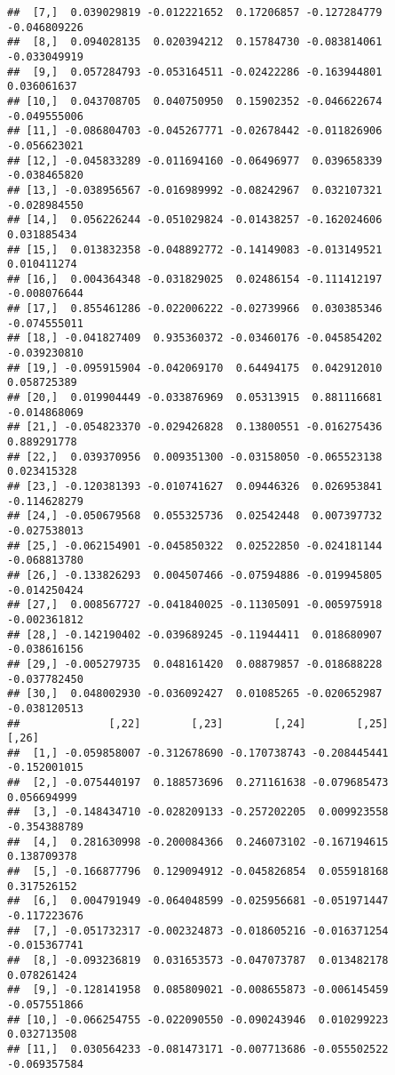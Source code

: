 \documentclass[
]{book}
\begin{document}
\begin{verbatim}
##  [7,]  0.039029819 -0.012221652  0.17206857 -0.127284779 -0.046809226
##  [8,]  0.094028135  0.020394212  0.15784730 -0.083814061 -0.033049919
##  [9,]  0.057284793 -0.053164511 -0.02422286 -0.163944801  0.036061637
## [10,]  0.043708705  0.040750950  0.15902352 -0.046622674 -0.049555006
## [11,] -0.086804703 -0.045267771 -0.02678442 -0.011826906 -0.056623021
## [12,] -0.045833289 -0.011694160 -0.06496977  0.039658339 -0.038465820
## [13,] -0.038956567 -0.016989992 -0.08242967  0.032107321 -0.028984550
## [14,]  0.056226244 -0.051029824 -0.01438257 -0.162024606  0.031885434
## [15,]  0.013832358 -0.048892772 -0.14149083 -0.013149521  0.010411274
## [16,]  0.004364348 -0.031829025  0.02486154 -0.111412197 -0.008076644
## [17,]  0.855461286 -0.022006222 -0.02739966  0.030385346 -0.074555011
## [18,] -0.041827409  0.935360372 -0.03460176 -0.045854202 -0.039230810
## [19,] -0.095915904 -0.042069170  0.64494175  0.042912010  0.058725389
## [20,]  0.019904449 -0.033876969  0.05313915  0.881116681 -0.014868069
## [21,] -0.054823370 -0.029426828  0.13800551 -0.016275436  0.889291778
## [22,]  0.039370956  0.009351300 -0.03158050 -0.065523138  0.023415328
## [23,] -0.120381393 -0.010741627  0.09446326  0.026953841 -0.114628279
## [24,] -0.050679568  0.055325736  0.02542448  0.007397732 -0.027538013
## [25,] -0.062154901 -0.045850322  0.02522850 -0.024181144 -0.068813780
## [26,] -0.133826293  0.004507466 -0.07594886 -0.019945805 -0.014250424
## [27,]  0.008567727 -0.041840025 -0.11305091 -0.005975918 -0.002361812
## [28,] -0.142190402 -0.039689245 -0.11944411  0.018680907 -0.038616156
## [29,] -0.005279735  0.048161420  0.08879857 -0.018688228 -0.037782450
## [30,]  0.048002930 -0.036092427  0.01085265 -0.020652987 -0.038120513
##              [,22]        [,23]        [,24]        [,25]        [,26]
##  [1,] -0.059858007 -0.312678690 -0.170738743 -0.208445441 -0.152001015
##  [2,] -0.075440197  0.188573696  0.271161638 -0.079685473  0.056694999
##  [3,] -0.148434710 -0.028209133 -0.257202205  0.009923558 -0.354388789
##  [4,]  0.281630998 -0.200084366  0.246073102 -0.167194615  0.138709378
##  [5,] -0.166877796  0.129094912 -0.045826854  0.055918168  0.317526152
##  [6,]  0.004791949 -0.064048599 -0.025956681 -0.051971447 -0.117223676
##  [7,] -0.051732317 -0.002324873 -0.018605216 -0.016371254 -0.015367741
##  [8,] -0.093236819  0.031653573 -0.047073787  0.013482178  0.078261424
##  [9,] -0.128141958  0.085809021 -0.008655873 -0.006145459 -0.057551866
## [10,] -0.066254755 -0.022090550 -0.090243946  0.010299223  0.032713508
## [11,]  0.030564233 -0.081473171 -0.007713686 -0.055502522 -0.069357584

\end{verbatim}
\end{document}
